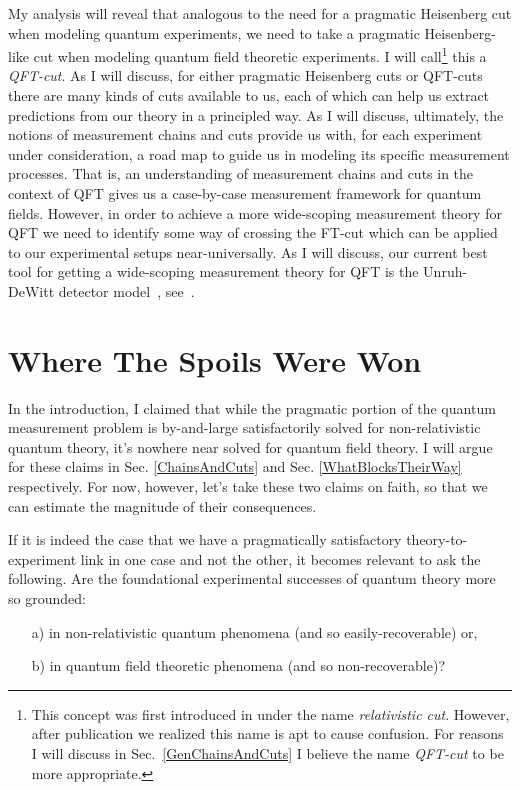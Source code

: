 \documentclass[prd,twocolumn,superscriptaddress,floatfix,amsmath,amssymb,amsfonts,nofootinbib]{revtex4-2}
\begin{document}
My analysis will reveal that analogous to the need for a pragmatic Heisenberg cut when modeling quantum experiments, we need to take a pragmatic Heisenberg-like cut when modeling quantum field theoretic experiments. I will call\footnote{This concept was first introduced in \cite{TaleOfTwo} under the name \textit{relativistic cut}. However, after publication we realized this name is apt to cause confusion. For reasons I will discuss in Sec.~\ref{GenChainsAndCuts} I believe the name \textit{QFT-cut} to be more appropriate.} this a \textit{QFT-cut}. As I will discuss, for either pragmatic Heisenberg cuts or QFT-cuts there are many kinds of cuts available to us, each of which can help us extract predictions from our theory in a principled way. As I will discuss, ultimately, the notions of measurement chains and cuts provide us with, for each experiment under consideration, a road map to guide us in modeling its specific measurement processes. That is, an understanding of measurement chains and cuts in the context of QFT gives us a case-by-case measurement framework for quantum fields. However, in order to achieve a more wide-scoping measurement theory for QFT we need to identify some way of crossing the FT-cut which can be applied to our experimental setups near-universally. As I will discuss, our current best tool for getting a wide-scoping measurement theory for QFT is the Unruh-DeWitt detector model~\cite{Unruh1976,BLHu2007, Brown2013, Hotta2020, Zeromode,TaleOfTwo,Adam,Valentini1991, Reznik2003, Pozas-Kerstjens:2015,Menicucci, Terno2016, Cosmo, Henderson2018}, see~\cite{pologomez2021detectorbased}.

\section{Where The Spoils Were Won}\label{WhereTheSpoilsWereWon}
In the introduction, I claimed that while the pragmatic portion of the quantum measurement problem is by-and-large satisfactorily solved for non-relativistic quantum theory, it's nowhere near solved for quantum field theory. I will argue for these claims in Sec. \ref{ChainsAndCuts} and Sec. \ref{WhatBlocksTheirWay} respectively. For now, however, let's take these two claims on faith, so that we can estimate the magnitude of their consequences. 

If it is indeed the case that we have a pragmatically satisfactory theory-to-experiment link in one case and not the other, it becomes relevant to ask the following. Are the foundational experimental successes of quantum theory more so grounded:
\begin{itemize}
    \item[a)] in non-relativistic quantum phenomena (and so easily-recoverable) or,
    \item[b)] in quantum field theoretic phenomena (and so non-recoverable)?
\end{itemize}
 
\end{document}
